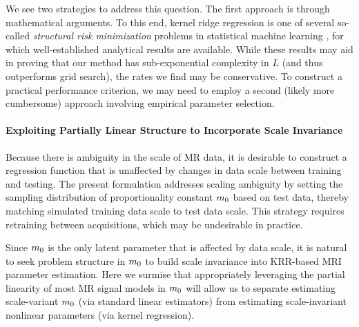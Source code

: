 We see two strategies to address this question.
The first approach 
is through mathematical arguments.
To this end,
kernel ridge regression
is one of several so-called 
\emph{structural risk minimization} problems
in statistical machine learning \cite{cortes:95:svn},
for which well-established analytical results are available.
While these results may aid 
in proving that our method 
has sub-exponential complexity in $L$
(and thus outperforms grid search),
the rates we find may be conservative.
To construct a practical performance criterion,
we may need to employ a second 
(likely more cumbersome) approach
involving empirical parameter selection.

\paragraph{Exploiting Partially Linear Structure to Incorporate Scale Invariance}
Because there is ambiguity
in the scale of MR data,
it is desirable
to construct a regression function
that is unaffected
by changes in data scale 
between training and testing.
The present formulation 
addresses scaling ambiguity
by setting the sampling distribution
of proportionality constant $m_0$
based on test data,
thereby matching simulated training data scale
to test data scale.
This strategy requires retraining 
between acquisitions,
which may be undesirable in practice.

Since $m_0$ is the only latent parameter
that is affected by data scale,
it is natural
to seek problem structure
in $m_0$ 
to build scale invariance
into KRR-based MRI parameter estimation.
Here we surmise 
that appropriately leveraging the partial linearity
of most MR signal models in $m_0$
will allow us
to separate estimating scale-variant $m_0$
(via standard linear estimators)
from estimating scale-invariant nonlinear parameters
(via kernel regression).

